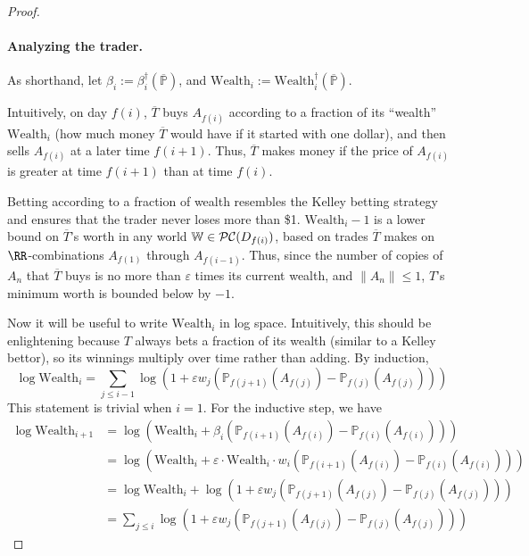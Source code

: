 \documentclass[authordate,onecolumn,noenvironments]{miri-tech-article}
\numberwithin{equation}{subsection}
\newcommand{\seq}[1]{{\overline{#1}}}
\newcommand{\fuz}{w}
\newcommand{\deff}{f}
\newcommand{\aff}{A}
\newcommand{\trade}{T}%
\newcommand{\Trader}{\seq{\trade}} %
\newcommand{\gens}{\dagger}
\newcommand{\gen}[1]{{#1^\gens}}
\newcommand{\BelState}{\mathbb{P}}
\newcommand{\pt}{\BelState}
\newcommand{\MP}{\seq{\pt}}
\newcommand{\ftn}{(\MP)} %
\newcommand{\dt}{D}
\newcommand{\pcworlds}{\mathcal{P\-C}}
\newcommand{\World}{\mathbb{W}}
\begin{document}
\begin{proof}
\paragraph{Analyzing the trader.}
As shorthand, let $\beta_i := \gen{\beta_i} \ftn$, and $\mathrm{Wealth}_i := \gen{\mathrm{Wealth}_i} \ftn$.

Intuitively, on day $\deff(i)$, $\Trader$ buys $\aff_{\deff(i)}$ according to a fraction of its ``wealth'' $\mathrm{Wealth}_i$ (how much money $\Trader$ would have if it started with one dollar), and then sells $\aff_{\deff(i)}$ at a later time $\deff(i+1)$.  Thus, $\Trader$ makes money if the price of $\aff_{\deff(i)}$ is greater at time $\deff(i+1)$ than at time $\deff(i)$.  

Betting according to a fraction of wealth resembles the Kelley betting strategy and ensures that the trader never loses more than \$1.
$\mathrm{Wealth}_i - 1$ is a lower bound on $\Trader$'s worth in any world $\World\in\pcworlds(\dt_{\deff(i)})$, based on trades $\Trader$ makes on  $\RR$-combinations $\aff_{\deff(1)}$ through $\aff_{\deff(i-1)}$.  Thus, since the number of copies of $\aff_n$ that $\Trader$ buys is no more than $\varepsilon$ times its current wealth, and $\|\aff_n\| \leq 1$, $T$'s minimum worth is bounded below by $-1$.

Now it will be useful to write $\mathrm{Wealth}_i$ in log space.  Intuitively, this should be enlightening because $T$ always bets a fraction of its wealth (similar to a Kelley bettor), so its winnings multiply over time rather than adding. By induction,
\[
\log \mathrm{Wealth}_i 
= \sum_{j\le i-1} \log \left(1 + \varepsilon \fuz_j (\pt_{\deff(j+1)}(\aff_{\deff(j)}) - \pt_{\deff(j)}(\aff_{\deff(j)}))\right)
\]
This statement is trivial when $i=1$.  For the inductive step, we have
\begin{align*}
  \log \mathrm{Wealth}_{i+1} 
  &=
  \log \left(\mathrm{Wealth}_i + \beta_i (\pt_{\deff(i+1)}(\aff_{\deff(i)}) - \pt_{\deff(i)}(\aff_{\deff(i)})) \right)
  \\
  &=
  \log \left(\mathrm{Wealth}_i + \varepsilon \cdot \mathrm{Wealth}_i \cdot \fuz_i (\pt_{\deff(i+1)}(\aff_{\deff(i)}) - \pt_{\deff(i)}(\aff_{\deff(i)})) \right)
  \\
  &= 
  \log \mathrm{Wealth}_i + \log\left(1 + \varepsilon \fuz_j (\pt_{\deff(j+1)}(\aff_{\deff(j)}) - \pt_{\deff(j)}(\aff_{\deff(j)}))\right)
  \\
  &=
  \sum_{j\le i} \log \left(1 + \varepsilon \fuz_j (\pt_{\deff(j+1)}(\aff_{\deff(j)}) - \pt_{\deff(j)}(\aff_{\deff(j)}))\right)
\end{align*}



\end{proof}
\end{document}
